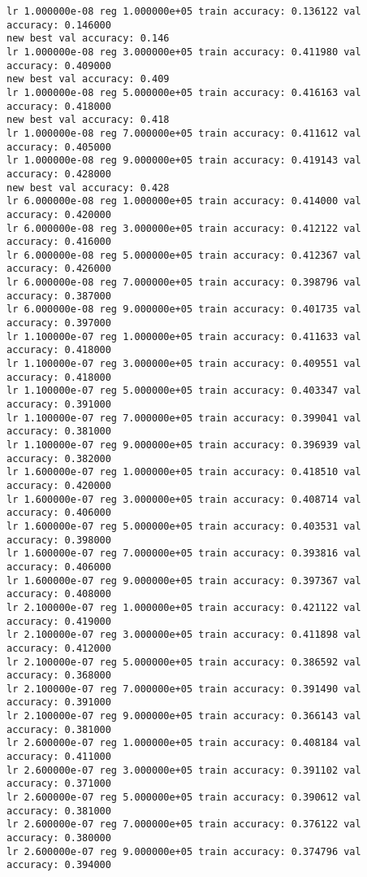 \documentclass[11pt]{article}
\begin{document}
    \begin{Verbatim}[commandchars=\\\{\}]
lr 1.000000e-08 reg 1.000000e+05 train accuracy: 0.136122 val accuracy: 0.146000
new best val accuracy: 0.146
lr 1.000000e-08 reg 3.000000e+05 train accuracy: 0.411980 val accuracy: 0.409000
new best val accuracy: 0.409
lr 1.000000e-08 reg 5.000000e+05 train accuracy: 0.416163 val accuracy: 0.418000
new best val accuracy: 0.418
lr 1.000000e-08 reg 7.000000e+05 train accuracy: 0.411612 val accuracy: 0.405000
lr 1.000000e-08 reg 9.000000e+05 train accuracy: 0.419143 val accuracy: 0.428000
new best val accuracy: 0.428
lr 6.000000e-08 reg 1.000000e+05 train accuracy: 0.414000 val accuracy: 0.420000
lr 6.000000e-08 reg 3.000000e+05 train accuracy: 0.412122 val accuracy: 0.416000
lr 6.000000e-08 reg 5.000000e+05 train accuracy: 0.412367 val accuracy: 0.426000
lr 6.000000e-08 reg 7.000000e+05 train accuracy: 0.398796 val accuracy: 0.387000
lr 6.000000e-08 reg 9.000000e+05 train accuracy: 0.401735 val accuracy: 0.397000
lr 1.100000e-07 reg 1.000000e+05 train accuracy: 0.411633 val accuracy: 0.418000
lr 1.100000e-07 reg 3.000000e+05 train accuracy: 0.409551 val accuracy: 0.418000
lr 1.100000e-07 reg 5.000000e+05 train accuracy: 0.403347 val accuracy: 0.391000
lr 1.100000e-07 reg 7.000000e+05 train accuracy: 0.399041 val accuracy: 0.381000
lr 1.100000e-07 reg 9.000000e+05 train accuracy: 0.396939 val accuracy: 0.382000
lr 1.600000e-07 reg 1.000000e+05 train accuracy: 0.418510 val accuracy: 0.420000
lr 1.600000e-07 reg 3.000000e+05 train accuracy: 0.408714 val accuracy: 0.406000
lr 1.600000e-07 reg 5.000000e+05 train accuracy: 0.403531 val accuracy: 0.398000
lr 1.600000e-07 reg 7.000000e+05 train accuracy: 0.393816 val accuracy: 0.406000
lr 1.600000e-07 reg 9.000000e+05 train accuracy: 0.397367 val accuracy: 0.408000
lr 2.100000e-07 reg 1.000000e+05 train accuracy: 0.421122 val accuracy: 0.419000
lr 2.100000e-07 reg 3.000000e+05 train accuracy: 0.411898 val accuracy: 0.412000
lr 2.100000e-07 reg 5.000000e+05 train accuracy: 0.386592 val accuracy: 0.368000
lr 2.100000e-07 reg 7.000000e+05 train accuracy: 0.391490 val accuracy: 0.391000
lr 2.100000e-07 reg 9.000000e+05 train accuracy: 0.366143 val accuracy: 0.381000
lr 2.600000e-07 reg 1.000000e+05 train accuracy: 0.408184 val accuracy: 0.411000
lr 2.600000e-07 reg 3.000000e+05 train accuracy: 0.391102 val accuracy: 0.371000
lr 2.600000e-07 reg 5.000000e+05 train accuracy: 0.390612 val accuracy: 0.381000
lr 2.600000e-07 reg 7.000000e+05 train accuracy: 0.376122 val accuracy: 0.380000
lr 2.600000e-07 reg 9.000000e+05 train accuracy: 0.374796 val accuracy: 0.394000

\end{Verbatim}
\end{document}
